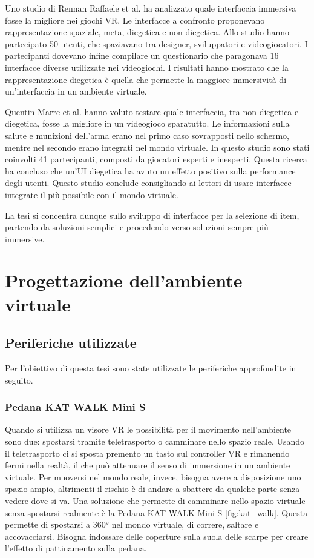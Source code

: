 \documentclass[target=bach,aauheader=]{thud}
\begin{document}
Uno studio di Rennan Raffaele et al.\cite{Raffaele} ha analizzato quale interfaccia immersiva fosse la migliore nei giochi VR.
Le interfacce a confronto proponevano rappresentazione spaziale, meta, diegetica e non-diegetica.
Allo studio hanno partecipato 50 utenti, che spaziavano tra designer, sviluppatori e videogiocatori.
I partecipanti dovevano infine compilare un questionario che paragonava 16 interfacce diverse utilizzate nei videogiochi.
I risultati hanno mostrato che la rappresentazione diegetica è quella che permette la maggiore immersività di un'interfaccia in un ambiente virtuale.

Quentin Marre et al. \cite{Marre} hanno voluto testare quale interfaccia, tra non-diegetica e diegetica, fosse la migliore in un videogioco sparatutto.
Le informazioni sulla salute e munizioni dell'arma erano nel primo caso sovrapposti nello schermo, mentre nel secondo erano integrati nel mondo virtuale.
In questo studio sono stati coinvolti 41 partecipanti, composti da giocatori esperti e inesperti. 
Questa ricerca ha concluso che un'UI diegetica ha avuto un effetto positivo sulla performance degli utenti.
Questo studio conclude consigliando ai lettori di usare interfacce integrate il più possibile con il mondo virtuale.

La tesi si concentra dunque sullo sviluppo di interfacce per la selezione di item, partendo da soluzioni semplici e procedendo verso soluzioni sempre più immersive. 

\chapter{Progettazione dell'ambiente virtuale} %

\section{Periferiche utilizzate}
Per l'obiettivo di questa tesi sono state utilizzate le periferiche approfondite in seguito.

\subsection{Pedana KAT WALK Mini S}
Quando si utilizza un visore VR le possibilità per il movimento nell'ambiente sono due: spostarsi tramite teletrasporto o camminare nello spazio reale.
Usando il teletrasporto ci si sposta premento un tasto sul controller VR e rimanendo fermi nella realtà, il che può attenuare il senso di immersione in un ambiente virtuale.
Per muoversi nel mondo reale, invece, bisogna avere a disposizione uno spazio ampio, altrimenti il rischio è di andare a sbattere da qualche parte senza vedere dove si va.
Una soluzione che permette di camminare nello spazio virtuale senza spostarsi realmente è la Pedana KAT WALK Mini S \ref{fig:kat_walk}.
Questa permette di spostarsi a 360° nel mondo virtuale, di correre, saltare e accovacciarsi. 
Bisogna indossare delle coperture sulla suola delle scarpe per creare l'effetto di pattinamento sulla pedana.    
\end{document}
